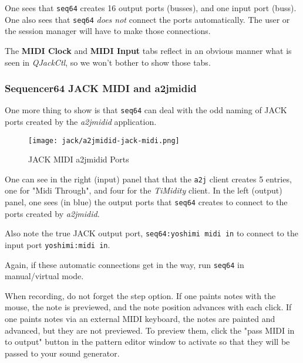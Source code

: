    One sees that \texttt{seq64} creates 16 output ports (busses), and one input
   port (buss).  One also sees that \texttt{seq64} \textsl{does not} connect
   the ports automatically.  The user or the session manager will have to make
   those connections.

   The \textbf{MIDI Clock} and \textbf{MIDI Input} tabs reflect in an obvious
   manner what is seen in \textsl{QJackCtl}, so we won't bother to show those
   tabs.

\subsubsection{Sequencer64 JACK MIDI and a2jmidid}
\label{subsubsec:seq64_jack_midi_a2jmidid}

   One more thing to show is that \texttt{seq64} can deal with the odd naming
   of JACK ports created by the \textsl{a2jmidid} application.

\begin{figure}[H]
   \centering 
   \texttt{[image: jack/a2jmidid-jack-midi.png]}
   \caption{JACK MIDI a2jmidid Ports}
   \label{fig:seq64_a2jmidid_jack_midi}
\end{figure}

   One can see in the right (input) panel that that the \texttt{a2j} client
   creates 5 entries, one for "Midi Through", and four for the
   \textsl{TiMidity} client.
   In the left (output) panel, one sees (in blue) the output
   ports that \texttt{seq64} creates to connect to the ports created by
   \textsl{a2jmidid}.

   Also note the true JACK output port,
   \texttt{seq64:yoshimi midi in} to connect to the input port
   \texttt{yoshimi:midi in}.

   Again, if these automatic connections get in the way, run \texttt{seq64} in
   manual/virtual mode.

   When recording, do not forget the step option.  If one paints notes with the
   mouse, the note is previewed, and the note position advances with each
   click.  If one paints notes via an external MIDI keyboard, the notes are
   painted and advanced, but they are not previewed.  To preview them, click
   the "pass MIDI in to output" button in the pattern editor window to activate
   so that they will be passed to your sound generator.


